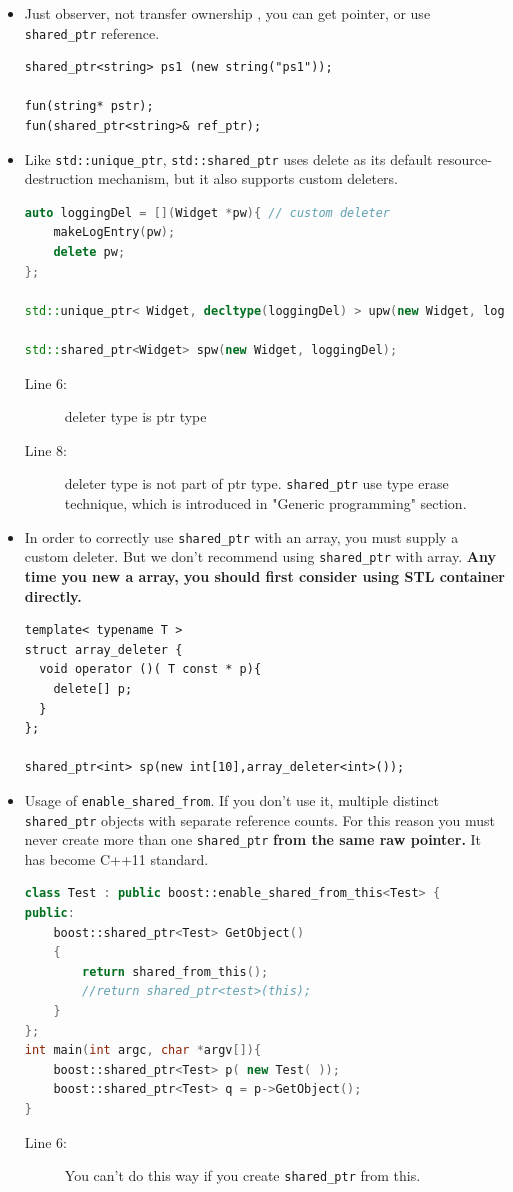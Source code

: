\documentclass[a4paper,11pt,twoside]{book}
\begin{document}
\begin{itemize}
\item Just observer, not transfer ownership , you can get pointer, or use \texttt{shared\_ptr} reference. 
\begin{lstlisting}[numbers = none]
shared_ptr<string> ps1 (new string("ps1"));

fun(string* pstr);
fun(shared_ptr<string>& ref_ptr);
\end{lstlisting}


\item Like \texttt{std::unique\_ptr}, \texttt{std::shared\_ptr} uses delete as its default resource-destruction mechanism, but it also supports custom deleters.
\begin{lstlisting}[frame=single, language=c++]
auto loggingDel = [](Widget *pw){ // custom deleter
	makeLogEntry(pw);
	delete pw;
};

std::unique_ptr< Widget, decltype(loggingDel) > upw(new Widget, loggingDel);

std::shared_ptr<Widget> spw(new Widget, loggingDel);
\end{lstlisting}
\begin{description}
	\item[Line 6:] deleter type is ptr type
	\item[Line 8:] deleter type is not part of ptr type. \texttt{shared\_ptr} use type erase technique, which is introduced in "Generic programming" section. 
\end{description}

\item In order to correctly use \texttt{shared\_ptr} with an array, you must supply a custom deleter. But we don't recommend using \texttt{shared\_ptr} with array. \textbf{Any time you new a array, you should first consider using STL container directly.}
\begin{lstlisting}[numbers=none]
template< typename T >
struct array_deleter {
  void operator ()( T const * p){
    delete[] p;
  }
};

shared_ptr<int> sp(new int[10],array_deleter<int>());
\end{lstlisting}

\item Usage of \texttt{enable\_shared\_from}. If you don't use it, multiple distinct \texttt{shared\_ptr} objects with separate reference counts. For this reason you must never create more than one \texttt{shared\_ptr} \textbf{from the same raw pointer.} It has become C++11 standard.
\begin{lstlisting}[frame=single, language=c++]
class Test : public boost::enable_shared_from_this<Test> {
public:
    boost::shared_ptr<Test> GetObject()
    {
        return shared_from_this();
        //return shared_ptr<test>(this);
    }
};
int main(int argc, char *argv[]){
    boost::shared_ptr<Test> p( new Test( ));
    boost::shared_ptr<Test> q = p->GetObject();
}
\end{lstlisting}
\begin{description}
	\item[Line 6:] You can't do this way if you create \texttt{shared\_ptr} from this.
\end{description}

\end{itemize}
\end{document}
